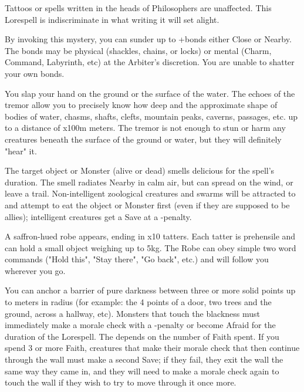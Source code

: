 \begin{multicols*}{2}
Tattoos or spells written in the heads of Philosophers are unaffected.  This Lorespell is indiscriminate in what writing it will set alight.


\LITURGY [
  Name = Shatter Bonds,
  Link = arcana-mystery-shatter-bonds,
  Paradigm = Errant,
  Duration = Instant
]

By invoking this mystery, you can sunder up to \DICE+\DICE bonds either Close or Nearby.  The bonds may be physical (shackles, chains, or locks) or mental (Charm, Command, Labyrinth, etc) at the Arbiter's discretion. You are unable to shatter your own bonds.

\LITURGY [
  Name = Sound the Deeps,
  Link = arcana-mystery-sound-the-deeps,
  Paradigm =  Cthonic,
  Duration = Instant
]

You slap your hand on the ground or the surface of the water.  The echoes of the tremor allow you to precisely know how deep and the approximate shape of bodies of water, chasms, shafts, clefts, mountain peaks, caverns, passages, etc. up to a distance of \DICE x100m meters. The tremor is not enough to stun or harm any creatures beneath the surface of the ground or water, but they will definitely "hear" it.

\LITURGY [
  Name = Tasty,
  Link = arcana-mystery-tasty,
  Paradigm = Monstrous,
  Duration = Session
]

The target object or Monster (alive or dead) smells delicious for the spell's duration.  The smell radiates Nearby in calm air, but can spread on the wind, or leave a trail.  Non-intelligent zoological creatures and swarms will be attracted to and attempt to eat the object or Monster first (even if they are supposed to be allies); intelligent creatures get a Save at a -\DICE penalty. 

\cbreak


\LITURGY [
  Name = Tattered Robe,
  Link = arcana-mystery-tattered-robe,
  Paradigm = Monstrous,
  Duration = Session
]

A saffron-hued robe appears, ending in \DICE x10 tatters.  Each tatter is prehensile and can hold a small object weighing up to 5kg. The Robe can obey simple two word commands ("Hold this", "Stay there", "Go back", etc.) and will follow you wherever you go.

\LITURGY [
  Name = Wall of Gloom,
  Link = arcana-mystery-wall-of-gloom,
  Paradigm = Ruinous,
  Duration = Session
]

You can anchor a barrier of pure darkness between three or more solid points up to \DICE meters in radius (for example: the 4 points of a door, two trees and the ground, across a hallway, etc).  Monsters that touch the blackness must immediately make a morale check with a -\DICE penalty or become Afraid for the duration of the Lorespell. The \Duration depends on the number of Faith spent.  If you spend 3 or more Faith, creatures that make their morale check that then continue through the wall must make a second Save; if they fail, they exit the wall the same way they came in, and they will need to make a morale check again to touch the wall if they wish to try to move through it once more.


\end{multicols*}
